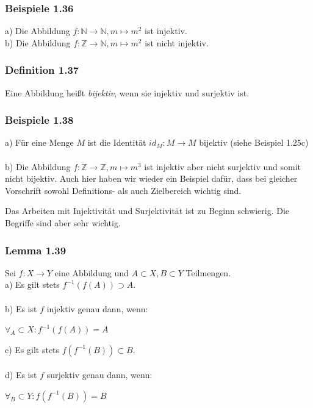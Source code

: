 \documentclass{article}
\begin{document}
\subsubsection*{Beispiele 1.36}
a) Die Abbildung $f: \mathbb{N} \rightarrow \mathbb{N}, m \mapsto m^2$ ist injektiv. \\
b) Die Abbildung $f: \mathbb{Z} \rightarrow \mathbb{N}, m \mapsto m^2$ ist nicht injektiv. \\

\subsubsection*{Definition 1.37}
Eine Abbildung heißt \textit{bijektiv}, wenn sie injektiv und surjektiv ist.

\subsubsection*{Beispiele 1.38}
a) Für eine Menge $M$ ist die Identität $id_M: M \rightarrow M$ bijektiv (siehe Beispiel 1.25c) \\
\\
b) Die Abbildung $f: \mathbb{Z} \rightarrow \mathbb{Z}, m \mapsto m^3$ ist injektiv aber nicht surjektiv und somit nicht bijektiv. Auch hier haben wir wieder ein Beispiel dafür, dass bei gleicher Vorschrift sowohl Definitions- als auch Zielbereich wichtig sind. \

Das Arbeiten mit Injektivität und Surjektivität ist zu Beginn schwierig. Die Begriffe sind aber sehr wichtig.

\subsubsection*{Lemma 1.39}
Sei $f: X \rightarrow Y$ eine Abbildung und $A \subset X, B \subset Y$ Teilmengen. \\
a) Es gilt stets $f^{-1}(f(A)) \supset A$. \\
\\
b) Es ist $f$ injektiv genau dann, wenn:
\begin{center}
    $\forall_A \subset X: f^{-1}(f(A)) = A$
\end{center}

c) Es gilt stets $f(f^{-1}(B)) \subset B$. \\
\\
d) Es ist $f$ surjektiv genau dann, wenn:
\begin{center}
    $\forall_B \subset Y: f(f^{-1}(B)) = B$
\end{center}
\end{document}
